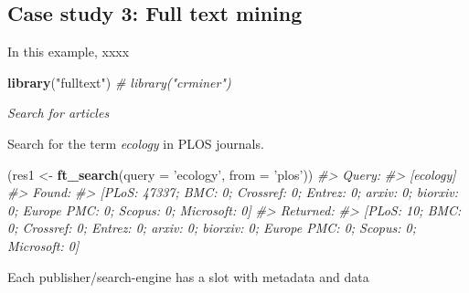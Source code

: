 \documentclass[author-year, review, 11pt]{components/elsarticle} %
\newenvironment{Shaded}{\begin{snugshade}}{\end{snugshade}}
\newcommand{\CommentTok}[1]{\textcolor[rgb]{0.56,0.35,0.01}{\textit{#1}}}
\newcommand{\DataTypeTok}[1]{\textcolor[rgb]{0.13,0.29,0.53}{#1}}
\newcommand{\KeywordTok}[1]{\textcolor[rgb]{0.13,0.29,0.53}{\textbf{#1}}}
\newcommand{\NormalTok}[1]{#1}
\newcommand{\OperatorTok}[1]{\textcolor[rgb]{0.81,0.36,0.00}{\textbf{#1}}}
\newcommand{\StringTok}[1]{\textcolor[rgb]{0.31,0.60,0.02}{#1}}
\begin{document}
\hypertarget{case-study-3-full-text-mining}{%
\subsection{Case study 3: Full text
mining}\label{case-study-3-full-text-mining}}

In this example, xxxx

\begin{Shaded}
\begin{Highlighting}[]
\KeywordTok{library}\NormalTok{(}\StringTok{"fulltext"}\NormalTok{)}
\CommentTok{# library("crminer")}
\end{Highlighting}
\end{Shaded}

\emph{Search for articles}

Search for the term \emph{ecology} in PLOS journals.

\begin{Shaded}
\begin{Highlighting}[]
\NormalTok{(res1 <-}\StringTok{ }\KeywordTok{ft_search}\NormalTok{(}\DataTypeTok{query =} \StringTok{'ecology'}\NormalTok{, }\DataTypeTok{from =} \StringTok{'plos'}\NormalTok{))}
\CommentTok{#> Query:}
\CommentTok{#>   [ecology] }
\CommentTok{#> Found:}
\CommentTok{#>   [PLoS: 47337; BMC: 0; Crossref: 0; Entrez: 0; arxiv: 0; biorxiv: 0; Europe PMC: 0; Scopus: 0; Microsoft: 0] }
\CommentTok{#> Returned:}
\CommentTok{#>   [PLoS: 10; BMC: 0; Crossref: 0; Entrez: 0; arxiv: 0; biorxiv: 0; Europe PMC: 0; Scopus: 0; Microsoft: 0]}
\end{Highlighting}
\end{Shaded}

Each publisher/search-engine has a slot with metadata and data

\begin{Shaded}
\end{Shaded}
\end{document}
